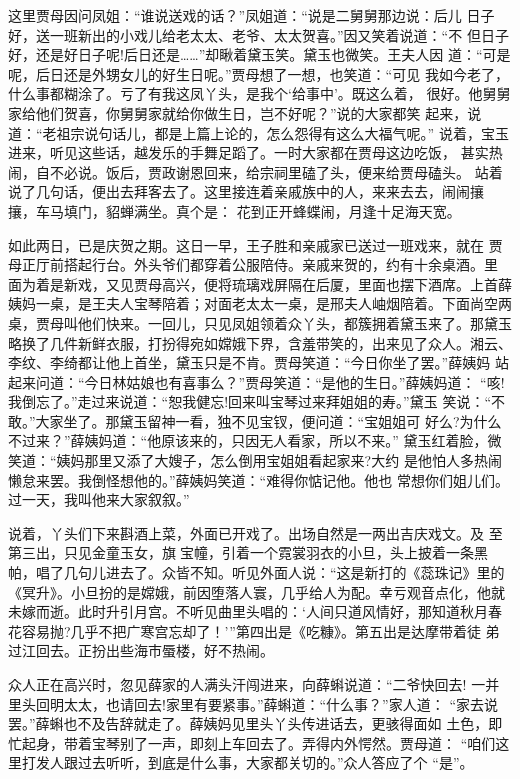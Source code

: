 这里贾母因问凤姐：“谁说送戏的话？”凤姐道：“说是二舅舅那边说：后儿
日子好，送一班新出的小戏儿给老太太、老爷、太太贺喜。”因又笑着说道：“不
但日子好，还是好日子呢!后日还是……”却瞅着黛玉笑。黛玉也微笑。王夫人因
道：“可是呢，后日还是外甥女儿的好生日呢。”贾母想了一想，也笑道：“可见
我如今老了，什么事都糊涂了。亏了有我这凤丫头，是我个‘给事中’。既这么着，
很好。他舅舅家给他们贺喜，你舅舅家就给你做生日，岂不好呢？”说的大家都笑
起来，说道：“老祖宗说句话儿，都是上篇上论的，怎么怨得有这么大福气呢。”
说着，宝玉进来，听见这些话，越发乐的手舞足蹈了。一时大家都在贾母这边吃饭，
甚实热闹，自不必说。饭后，贾政谢恩回来，给宗祠里磕了头，便来给贾母磕头。
站着说了几句话，便出去拜客去了。这里接连着亲戚族中的人，来来去去，闹闹攘
攘，车马填门，貂蝉满坐。真个是：
花到正开蜂蝶闹，月逢十足海天宽。

如此两日，已是庆贺之期。这日一早，王子胜和亲戚家已送过一班戏来，就在
贾母正厅前搭起行台。外头爷们都穿着公服陪侍。亲戚来贺的，约有十余桌酒。里
面为着是新戏，又见贾母高兴，便将琉璃戏屏隔在后厦，里面也摆下酒席。上首薛
姨妈一桌，是王夫人宝琴陪着；对面老太太一桌，是邢夫人岫烟陪着。下面尚空两
桌，贾母叫他们快来。一回儿，只见凤姐领着众丫头，都簇拥着黛玉来了。那黛玉
略换了几件新鲜衣服，打扮得宛如嫦娥下界，含羞带笑的，出来见了众人。湘云、
李纹、李绮都让他上首坐，黛玉只是不肯。贾母笑道：“今日你坐了罢。”薛姨妈
站起来问道：“今日林姑娘也有喜事么？”贾母笑道：“是他的生日。”薛姨妈道：
“咳!我倒忘了。”走过来说道：“恕我健忘!回来叫宝琴过来拜姐姐的寿。”黛玉
笑说：“不敢。”大家坐了。那黛玉留神一看，独不见宝钗，便问道：“宝姐姐可
好么?为什么不过来？”薛姨妈道：“他原该来的，只因无人看家，所以不来。”
黛玉红着脸，微笑道：“姨妈那里又添了大嫂子，怎么倒用宝姐姐看起家来?大约
是他怕人多热闹懒怠来罢。我倒怪想他的。”薛姨妈笑道：“难得你惦记他。他也
常想你们姐儿们。过一天，我叫他来大家叙叙。”

说着，丫头们下来斟酒上菜，外面已开戏了。出场自然是一两出吉庆戏文。及
至第三出，只见金童玉女，旗宝幢，引着一个霓裳羽衣的小旦，头上披着一条黑
帕，唱了几句儿进去了。众皆不知。听见外面人说：“这是新打的《蕊珠记》里的
《冥升》。小旦扮的是嫦娥，前因堕落人寰，几乎给人为配。幸亏观音点化，他就
未嫁而逝。此时升引月宫。不听见曲里头唱的：‘人间只道风情好，那知道秋月春
花容易抛?几乎不把广寒宫忘却了！’”第四出是《吃糠》。第五出是达摩带着徒
弟过江回去。正扮出些海市蜃楼，好不热闹。

众人正在高兴时，忽见薛家的人满头汗闯进来，向薛蝌说道：“二爷快回去!
一并里头回明太太，也请回去!家里有要紧事。”薛蝌道：“什么事？”家人道：
“家去说罢。”薛蝌也不及告辞就走了。薛姨妈见里头丫头传进话去，更骇得面如
土色，即忙起身，带着宝琴别了一声，即刻上车回去了。弄得内外愕然。贾母道：
“咱们这里打发人跟过去听听，到底是什么事，大家都关切的。”众人答应了个
“是”。

